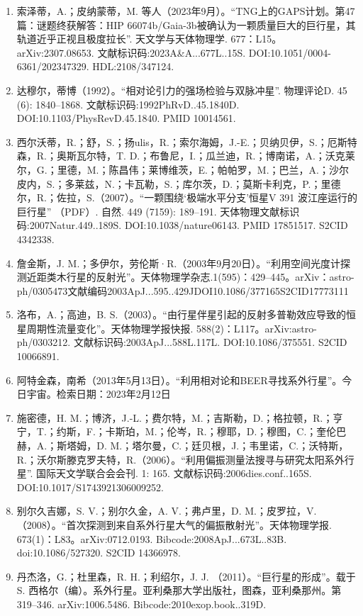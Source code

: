 \begin{enumerate}
\item 索泽蒂，A.；皮纳蒙蒂，M. 等人（2023年9月）。“TNG上的GAPS计划。第47篇：谜题终获解答：HIP 66074b/Gaia-3b被确认为一颗质量巨大的巨行星，其轨道近乎正视且极度拉长”. 天文学与天体物理学. 677：L15。arXiv:2307.08653. 文献标识码:2023A&A...677L..15S. DOI:10.1051/0004-6361/202347329. HDL:2108/347124.
\item 达穆尔，蒂博（1992）。“相对论引力的强场检验与双脉冲星”. 物理评论D. 45 (6): 1840–1868. 文献标识码:1992PhRvD..45.1840D. DOI:10.1103/PhysRevD.45.1840. PMID 10014561.
\item 西尔沃蒂，R.；舒，S.；扬ulis，R.；索尔海姆，J.-E.；贝纳贝伊，S.；厄斯特森，R.；奥斯瓦尔特，T. D.；布鲁尼，I.；瓜兰迪，R.；博南诺，A.；沃克莱尔，G.；里德，M.；陈昌伟；莱博维茨，E.；帕帕罗，M.；巴兰，A.；沙尔皮内，S.；多莱兹，N.；卡瓦勒，S.；库尔茨，D.；莫斯卡利克，P.；里德尔，R.；佐拉，S.（2007）。“一颗围绕‘极端水平分支’恒星V 391 波江座运行的巨行星” （PDF）. 自然. 449 (7159): 189–191. 天体物理文献标识码:2007Natur.449..189S. DOI:10.1038/nature06143. PMID 17851517. S2CID 4342338.
\item 詹金斯，J. M.；多伊尔，劳伦斯·R.（2003年9月20日）。“利用空间光度计探测近距类木行星的反射光”。天体物理学杂志.1(595)：429–445。arXiv：astro-ph/0305473文献编码2003ApJ...595..429JDOI10.1086/377165S2CID17773111
\item 洛布，A.；高迪，B. S.（2003）。“由行星伴星引起的反射多普勒效应导致的恒星周期性流量变化”。天体物理学报快报. 588(2)：L117。arXiv:astro-ph/0303212. 文献标识码:2003ApJ...588L.117L. DOI:10.1086/375551. S2CID 10066891.
\item 阿特金森，南希（2013年5月13日）。“利用相对论和BEER寻找系外行星”。今日宇宙。检索日期：2023年2月12日
\item 施密德，H. M.；博济，J.-L.；费尔特，M.；吉斯勒，D.；格拉顿，R.；亨宁，T.；约斯，F.；卡斯珀，M.；伦岑，R.；穆耶，D.；穆图，C.；奎伦巴赫，A.；斯塔姆，D. M.；塔尔曼，C.；廷贝根，J.；韦里诺，C.；沃特斯，R.；沃尔斯滕克罗夫特，R.（2006）。“利用偏振测量法搜寻与研究太阳系外行星”. 国际天文学联合会会刊. 1: 165. 文献标识码:2006dies.conf..165S. DOI:10.1017/S1743921306009252.
\item 别尔久吉娜，S. V.；别尔久金，A. V.；弗卢里，D. M.；皮罗拉，V.（2008）。“首次探测到来自系外行星大气的偏振散射光”。天体物理学报. 673(1)：L83。arXiv:0712.0193. Bibcode:2008ApJ...673L..83B. doi:10.1086/527320. S2CID 14366978.
\item 丹杰洛，G.；杜里森，R. H.；利绍尔，J. J. （2011）。“巨行星的形成”。载于 S. 西格尔（编）。系外行星。亚利桑那大学出版社，图森，亚利桑那州。第319–346. arXiv:1006.5486. Bibcode:2010exop.book..319D.

\end{enumerate}

